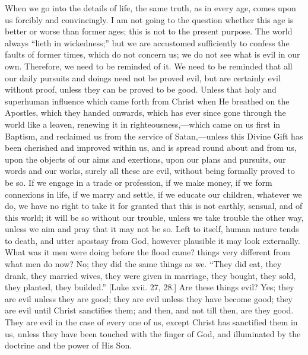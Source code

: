 When we go into the details of life, the same truth, as in every
age, comes upon us forcibly and convincingly. I am not going to the
question whether this age is better or worse than former ages; this is
not to the present purpose. The world always ``lieth in wickedness;'' but we are accustomed sufficiently to confess the
faults of former times, which do not concern us; we do not see what is
evil in our own. Therefore, we need to be reminded of it. We need to
be reminded that all our daily pursuits and doings need not be proved
evil, but are certainly evil without proof, unless they can be proved
to be good. Unless that holy and superhuman influence which came forth
from Christ when He breathed on the Apostles, which they handed
onwards, which has ever since gone through the world like a leaven,
renewing it in righteousness,—which came on us first in Baptism, and
reclaimed us from the service of Satan,—unless this Divine Gift has
been cherished and improved within us, and is spread round about and
from us, upon the objects of our aims and exertions, upon our plans
and pursuits, our words and our works, surely all these are evil,
without being formally proved to be so. If we engage in a trade or
profession, if we make money, if we form connexions in life, if we
marry and settle, if we educate our children, whatever we do, we have
no right to take it for granted that this is not earthly, sensual, and
of this world; it will be so without our trouble, unless we take
trouble the other way, unless we aim and pray that it may not be so.
Left to itself, human nature tends to death, and utter apostasy from
God, however plausible it may look externally. What was it men were
doing before the flood came? things very different from what men do
now? No; they did the same things as we. ``They did eat, they
drank, they married wives, they were given in marriage, they bought,
they sold, they planted, they builded.'' [Luke xvii. 27, 28.] Are
these things evil? Yes; they are evil unless they are good; they are
evil unless they have become good; they are evil until Christ
sanctifies them; and then, and not till then, are they good. They are
evil in the case of every one of us, except Christ has sanctified them
in us, unless they have been touched with the finger of God, and
illuminated by the doctrine and the power of His Son.

